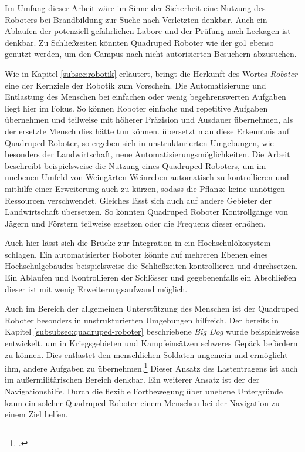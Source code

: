 Im Umfang dieser Arbeit wäre im Sinne der Sicherheit eine Nutzung des Roboters bei Brandbildung zur Suche nach Verletzten denkbar.
Auch ein Ablaufen der potenziell gefährlichen Labore und der Prüfung nach Leckagen ist denkbar.
Zu Schließzeiten könnten Quadruped Roboter wie der \gls{go1} ebenso genutzt werden, um den Campus nach nicht autorisierten
Besuchern abzusuchen.

Wie in Kapitel \ref{subsec:robotik} erläutert, bringt die Herkunft des Wortes \emph{Roboter} eine der Kernziele der Robotik zum Vorschein.
Die Automatisierung und Entlastung des Menschen bei einfachen oder wenig begehrenswerten Aufgaben liegt hier im Fokus.
So können Roboter einfache und repetitive Aufgaben übernehmen und teilweise mit höherer Präzision und Ausdauer übernehmen,
als der ersetzte Mensch dies hätte tun können.
übersetzt man diese Erkenntnis auf Quadruped Roboter, so ergeben sich in unstrukturierten Umgebungen, wie besonders der Landwirtschaft,
neue Automatisierungsmöglichkeiten.
Die Arbeit  beschreibt beispielsweise die Nutzung eines Quadruped Roboters, um im unebenen Umfeld
von Weingärten Weinreben automatisch zu kontrollieren und mithilfe einer Erweiterung auch zu kürzen, sodass die Pflanze
keine unnötigen Ressourcen verschwendet.
Gleiches lässt sich auch auf andere Gebieter der Landwirtschaft übersetzen.
So könnten Quadruped Roboter Kontrollgänge von Jägern und Förstern teilweise ersetzen oder die Frequenz dieser erhöhen.

Auch hier lässt sich die Brücke zur Integration in ein Hochschulökosystem schlagen.
Ein automatisierter Roboter könnte auf mehreren Ebenen eines Hochschulgebäudes beispielsweise die Schließzeiten kontrollieren und durchsetzen.
Ein Ablaufen und Kontrollieren der Schlösser und gegebenenfalls ein Abschließen dieser ist mit wenig Erweiterungsaufwand möglich.

Auch im Bereich der allgemeinen Unterstützung des Menschen ist der Quadruped Roboter besonders in unstrukturierten Umgebungen
hilfreich.
Der bereits in Kapitel \ref{subsubsec:quadruped-roboter} beschriebene \emph{Big Dog} wurde beispielsweise entwickelt, um
in Kriegsgebieten und Kampfeinsätzen schweres Gepäck befördern zu können.
Dies entlastet den menschlichen Soldaten ungemein und ermöglicht ihm, andere Aufgaben zu übernehmen.\footcite{bigdog}
Dieser Ansatz des Lastentragens ist auch im außermilitärischen Bereich denkbar.
Ein weiterer Ansatz ist der der Navigationshilfe.
Durch die flexible Fortbewegung über unebene Untergründe kann ein solcher Quadruped Roboter einem Menschen bei der Navigation
zu einem Ziel helfen.

